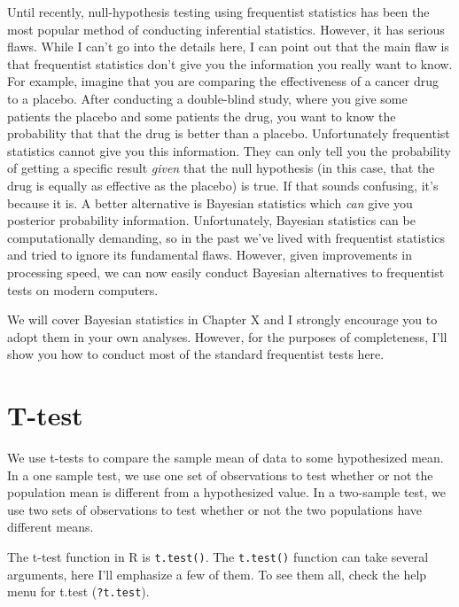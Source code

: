 \documentclass{tufte-book}\usepackage[]{graphicx}\usepackage[]{color}
\begin{document}
Until recently, null-hypothesis testing using frequentist statistics has been the most popular method of conducting inferential statistics. However, it has serious flaws. While I can't go into the details here, I can point out that the main flaw is that frequentist statistics don't give you the information you really want to know. For example, imagine that you are comparing the effectiveness of a cancer drug to a placebo. After conducting a double-blind study, where you give some patients the placebo and some patients the drug, you want to know the probability that that the drug is better than a placebo. Unfortunately frequentist statistics cannot give you this information. They can only tell you the probability of getting a specific result \textit{given} that the null hypothesis (in this case, that the drug is equally as effective as the placebo) is true. If that sounds confusing, it's because it is. A better alternative is Bayesian statistics which \textit{can} give you posterior probability information. Unfortunately, Bayesian statistics can be computationally demanding, so in the past we've lived with frequentist statistics and tried to ignore its fundamental flaws. However, given improvements in processing speed, we can now easily conduct Bayesian alternatives to frequentist tests on modern computers.

We will cover Bayesian statistics in Chapter X and I strongly encourage you to adopt them in your own analyses. However, for the purposes of completeness, I'll show you how to conduct most of the standard frequentist tests here.

\section{T-test}


We use t-tests to compare the sample mean of data to some hypothesized mean. In a one sample test, we use one set of observations to test whether or not the population mean is different from a hypothesized value. In a two-sample test, we use two sets of observations to test whether or not the two populations have different means.

The t-test function in R is \texttt{t.test()}. The \texttt{t.test()} function can take several arguments, here I'll emphasize a few of them. To see them all, check the help menu for t.test (\texttt{?t.test}).

\end{document}
